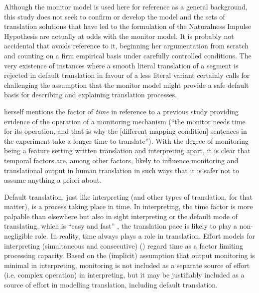 \documentclass[output=paper]{langscibook}
\begin{document}
Although the monitor model is used here for reference as a general background, this study does not seek to confirm or develop the model and the sets of translation solutions that have led to the formulation of the Naturalness Impulse Hypothesis are actually at odds with the monitor model. It is probably not accidental that \citet{Halverson2019} avoids reference to it, beginning her argumentation from scratch and counting on a firm empirical basis under carefully controlled conditions. The very existence of instances where a smooth literal translation of a segment is rejected in default translation in favour of a less literal variant certainly calls for challenging the assumption that the monitor model might provide a safe default basis for describing and explaining translation processes.

\citet[410]{Tirkkonen-Condit2005} herself mentions the factor of \textit{time} in reference to a previous study providing evidence of the operation of a monitoring mechanism (“the monitor needs time for its operation, and that is why the [different mapping condition] sentences in the experiment take a longer time to translate”). With the degree of monitoring being a feature setting written translation and interpreting apart, it is clear that temporal factors are, among other factors, likely to influence monitoring and translational output in human translation in such ways that it is safer not to assume anything a priori about.

Default translation, just like interpreting (and other types of translation, for that matter), is a process taking place in time. In interpreting, the time factor is more palpable than elsewhere but also in sight interpreting or the default mode of translating, which is “easy and fast” \citep[320]{Halverson2015}, the translation pace is likely to play a non-negligible role. In reality, time always plays a role in translation. Effort models for interpreting (simultaneous and consecutive) (\citealt{Gile1997,Gile2009}) regard time as a factor limiting processing capacity. Based on the (implicit) assumption that output monitoring is minimal in interpreting, monitoring is not included as a separate source of effort (i.e. complex operation) in interpreting, but it may be justifiably included as a source of effort in modelling translation, including default translation.
\end{document}

